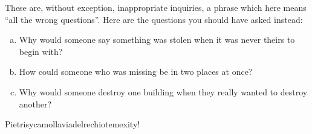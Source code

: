 \documentclass[11pt]{article}
\begin{document}



\begin{solution}
These are, without exception, inappropriate inquiries, a phrase which here means “all the wrong questions”.  Here are the questions you should have asked instead:
\begin{enumerate}[(a)]
\item Why would someone say something was stolen when it was never theirs to begin with?
\item How could someone who was missing be in two places at once?
\item Why would someone destroy one building when they really wanted to destroy another?
\end{enumerate}
\end{solution}

\begin{solution}[for 25\%]
Pietrisycamollaviadelrechiotemexity!
\end{solution}


\newtheorem{lemma}{Lemma}
\end{document}
